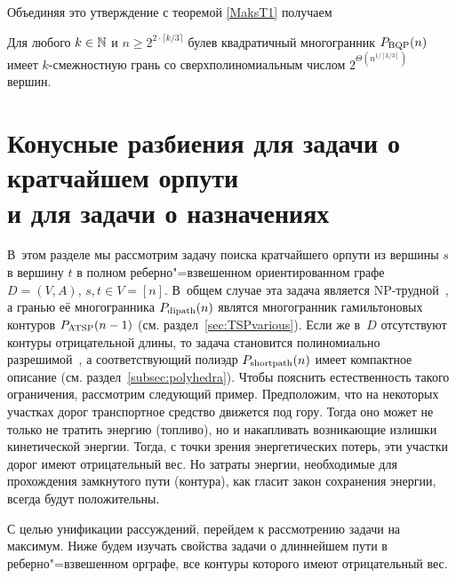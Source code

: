 Объединяя это утверждение с теоремой \ref{MaksT1} получаем

\begin{corollary} 
Для любого $k \in \mathbb{N}$ и $n \ge 2^{2\cdot \lceil k/3\rceil}$ булев квадратичный многогранник $P_{\textup{BQP}}(n)$ имеет $k$-смежностную грань со сверхполиномиальным числом $2^{{\Theta}\left( n^{1 / {\left\lceil k/3\right\rceil}}\right)}$ вершин.
\end{corollary} 



%
%


\section{\texorpdfstring{Конусные разбиения для задачи о кратчайшем орпути\\ и для задачи о назначениях}{Конусные разбиения для задачи о кратчайшем орпути и для задачи о назначениях}}
\label{sec:ShortPath2Assignment}

В~этом разделе мы рассмотрим задачу поиска кратчайшего орпути из вершины $s$ в вершину $t$ в полном реберно"=взвешенном ориентированном графе $D = (V,A)$, $s,t \in V = [n]$.
В~общем случае эта задача является NP-трудной~\cite{Garey:1982}, 
а гранью её многогранника $P_{\textup{dipath}}(n)$ являтся многогранник гамильтоновых контуров $P_{\textup{ATSP}}(n-1)$ (см. раздел~\ref{sec:TSPvarious}).
Если же в~$D$ отсутствуют контуры отрицательной длины, то задача становится полиномиально разрешимой~\cite[sec.~8.3]{SchrijverCO:2003}, а соответствующий полиэдр \(P_{\textup{shortpath}}(n)\) имеет компактное описание (см. раздел~\ref{subsec:polyhedra}).
Чтобы пояснить естественность такого ограничения, рассмотрим следующий пример.
Предположим, что на некоторых участках дорог транспортное средство движется под гору. Тогда оно может не только не тратить энергию (топливо), но и накапливать возникающие излишки кинетической энергии. Тогда, с точки зрения энергетических потерь, эти участки дорог имеют отрицательный вес. Но затраты энергии, необходимые для прохождения замкнутого пути (контура), как гласит закон сохранения энергии, всегда будут положительны.

С целью унификации рассуждений, перейдем к рассмотрению задачи на максимум.
Ниже будем изучать свойства задачи о длиннейшем пути в реберно"=взвешенном орграфе, все контуры которого имеют отрицательный вес.

